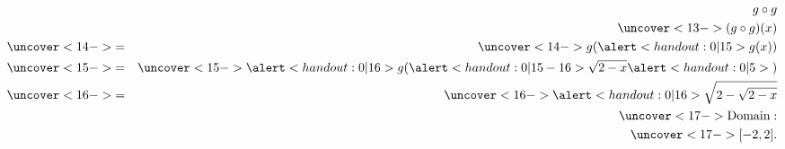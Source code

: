 \begin{frame}
\begin{example}[Example 7, p. 42]
\begin{columns}[t]
\begin{eqnarray*}
& &  g\circ g \\
& & \uncover<13->{(g\circ g)(x)}\\
& \uncover<14->{ = } & \uncover<14->{g(\alert<handout:0| 15>{g(x)})}\\
& \uncover<15->{ = } & \uncover<15->{\alert<handout:0| 16>{g(}\alert<handout:0| 15-16>{\sqrt{2 - x}}\alert<handout:0| 5>{)}}\\
& \uncover<16->{ = } & \uncover<16->{\alert<handout:0| 16>{\sqrt{2 - \sqrt{2-x}}}}\\
&&\uncover<17->{
\textrm{Domain}:}\\
&&\uncover<17->{
[-2 , 2].
}
\end{eqnarray*}
\end{columns}
\end{example}
\end{frame}
